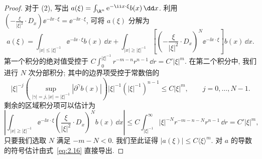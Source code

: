 \begin{proof}
对于 (2), 写出 $a(\xi) = \int_{\R^n} \ee^{-\ii x \cdot \xi} b(x) \,\dd x$. 利用 $(-\frac{\xi}{|\xi|^2} \cdot D_x) \ee^{-\ii x \cdot \xi} = \ee^{-\ii x \cdot \xi}$, 可将 $a(\xi)$ 分解为
\begin{equation}\label{eq:4.38}
    a(\xi) = \int_{|x| \le |\xi|^{-1}} \ee^{-\ii x \cdot \xi} b(x) \,\dd x + \int_{|x| \ge |\xi|^{-1}} \left[ \left(-\frac{\xi}{|\xi|^2} \cdot D_x\right)^N \ee^{-\ii x \cdot \xi} \right] b(x) \,\dd x.
\end{equation}
第一个积分的绝对值受控于 $C \int_0^{|\xi|^{-1}} r^{-m-n} r^{n-1} \,\dd r = C' |\xi|^m$. 在第二个积分中, 我们进行 $N$ 次分部积分; 其中的边界项受控于常数倍的
\begin{equation}\label{eq:4.39}
    |\xi|^{-j} \left( \sup_{|\gamma| = j, |x| = |\xi|^{-1}} |\partial^\gamma b(x)| \right) |\xi|^{-1} (|\xi|^{-1})^{n-1} \le C |\xi|^m, \qquad j = 0, \ldots, N - 1.
\end{equation}
剩余的区域积分项可以估计为
\begin{equation}\label{eq:4.40}
    \left| \int_{|x| \ge |\xi|^{-1}} \ee^{-\ii x \cdot \xi} \left( \frac{\xi}{|\xi|^2} \cdot D_x \right)^N b(x) \,\dd x \right| \le C \int_{|\xi|^{-1}}^\infty |\xi|^{-N} r^{-m-n-N} r^{n-1} \,\dd r = C' |\xi|^m,
\end{equation}
只要我们选取 $N$ 满足 $-m - N < 0$. 我们至此证得 $|a(\xi)| \le C \langle \xi \rangle^m$. 对 $a$ 的导数的符号估计由式~\eqref{eq:2.16} 直接导出.
\end{proof}

